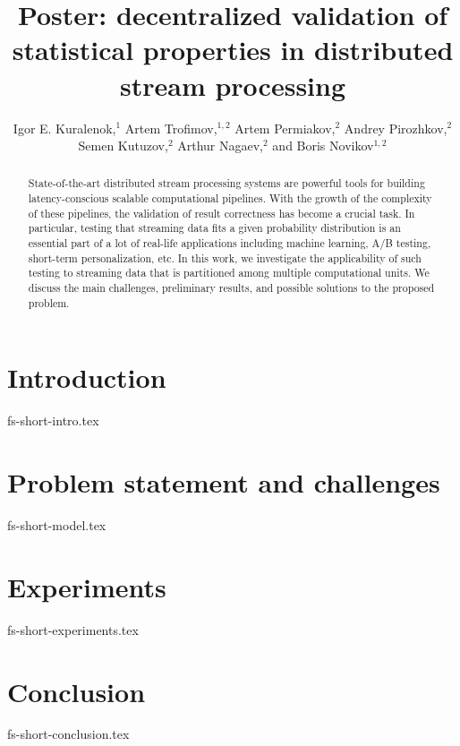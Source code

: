\documentclass[sigconf]{acmart}
\theoremstyle{remark}
\begin{document}

\title {Poster: decentralized validation of statistical properties in distributed stream processing}

\author{  Igor E. Kuralenok,$^1$     Artem Trofimov,$^ {1,2}$    Artem Permiakov,$^ {2}$   Andrey Pirozhkov,$^ {2}$    Semen Kutuzov,$^ {2}$     Arthur Nagaev,$^ {2}$    and  Boris Novikov$^ {1,2}$ }

\begin{abstract}
State-of-the-art distributed stream processing systems are powerful tools for building latency-conscious scalable computational pipelines. With the growth of the complexity of these pipelines, the validation of result correctness has become a crucial task. In particular, testing that streaming data fits a given probability distribution is an essential part of a lot of real-life applications including machine learning, A/B testing, short-term personalization, etc. In this work, we investigate the applicability of such testing to streaming data that is partitioned among multiple computational units. We discuss the main challenges, preliminary results, and possible solutions to the proposed problem.
\end {abstract}


\maketitle

\thispagestyle{empty}

\section {Introduction}
 {fs-short-intro.tex}


\section {Problem statement and challenges}
 {fs-short-model.tex}

\section {Experiments}
 {fs-short-experiments.tex}

\section {Conclusion}
 {fs-short-conclusion.tex}



\end{document}

